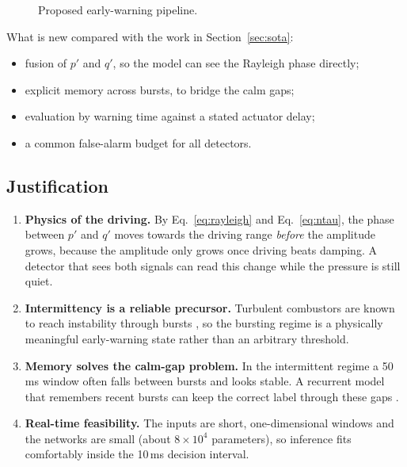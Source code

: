 \documentclass[11pt,a4paper]{article}
\newcommand{\pp}{p'}
\newcommand{\qq}{q'}
\begin{document}
\begin{figure}[H]\centering
{}
\caption{Proposed early-warning pipeline.}\label{fig:pipeline}
\end{figure}

What is new compared with the work in Section~\ref{sec:sota}:
\begin{itemize}
  \item fusion of $\pp$ and $\qq$, so the model can see the Rayleigh phase directly;
  \item explicit memory across bursts, to bridge the calm gaps;
  \item evaluation by warning time against a stated actuator delay;
  \item a common false-alarm budget for all detectors.
\end{itemize}

\subsection{Justification}
\begin{enumerate}
  \item \textbf{Physics of the driving.} By Eq.~\eqref{eq:rayleigh} and Eq.~\eqref{eq:ntau}, the phase between $\pp$ and $\qq$ moves towards the driving range \emph{before} the amplitude grows, because the amplitude only grows once driving beats damping. A detector that sees both signals can read this change while the pressure is still quiet.
  \item \textbf{Intermittency is a reliable precursor.} Turbulent combustors are known to reach instability through bursts \cite{nair2014}, so the bursting regime is a physically meaningful early-warning state rather than an arbitrary threshold.
  \item \textbf{Memory solves the calm-gap problem.} In the intermittent regime a 50\,ms window often falls between bursts and looks stable. A recurrent model that remembers recent bursts can keep the correct label through these gaps \cite{hochreiter1997}.
  \item \textbf{Real-time feasibility.} The inputs are short, one-dimensional windows and the networks are small (about $8\times10^4$ parameters), so inference fits comfortably inside the 10\,ms decision interval.
\end{enumerate}
\end{document}
